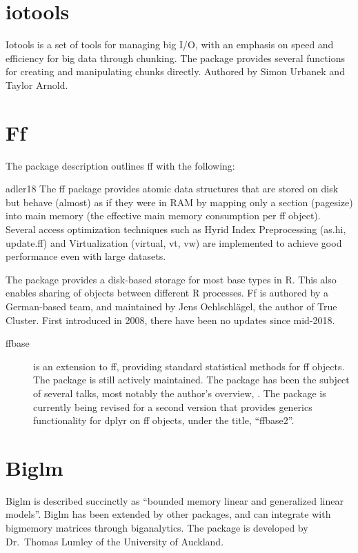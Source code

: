 \documentclass[10pt,a4paper]{article}
\begin{document}
\section{iotools}
\label{sec:iotools}

Iotools is a set of tools for managing big I/O, with an emphasis on
speed and efficiency for big data through chunking\cite{urbanek20b}.
The package provides several functions for creating and manipulating
chunks directly. Authored by Simon Urbanek and Taylor Arnold.

\section{Ff}
\label{sec:ff}

The package description outlines ff with the following:

\begin{displaycquote}{adler18}
  The ff package provides atomic data structures that are stored on
  disk but behave (almost) as if they were in RAM by mapping only a
  section (pagesize) into main memory (the effective main memory
  consumption per ff object). Several access optimization techniques
  such as Hyrid Index Preprocessing (as.hi, update.ff) and
  Virtualization (virtual, vt, vw) are implemented to achieve good
  performance even with large datasets.
\end{displaycquote}

The package provides a disk-based storage for most base types in R.
This also enables sharing of objects between different R processes. Ff
is authored by a German-based team, and maintained by Jens
Oehlschlägel, the author of True Cluster. First introduced in
2008\cite{adler08:_large_r}, there have been no updates since
mid-2018.

\begin{description}
\item[ffbase\cite{jonge20}] is an extension to ff, providing standard
  statistical methods for ff objects. The package is still actively
  maintained. The package has been the subject of several talks, most
  notably the author's overview, \textcite{wijffels13}. The package is
  currently being revised for a second version that provides generics
  functionality for dplyr on ff objects, under the title,
  ``ffbase2''\cite{jonge15}.
\end{description}

\section{Biglm}
\label{sec:biglm}

Biglm is described succinctly as \enquote{bounded memory linear and
  generalized linear models}\cite{lumley13}. Biglm has been extended
by other packages, and can integrate with bigmemory matrices through
biganalytics. The package is developed by Dr.~Thomas Lumley of the
University of Auckland.

\printbibliography{}
\end{document}
